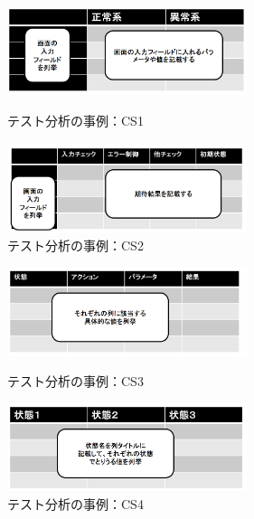 \documentclass[10pt,a4j]{jarticle}
\begin{document}
\begin{figure}[htbp]
 \begin{minipage}{0.5\hsize}
  \begin{center}
   \includegraphics[width=70mm]{./image/D-3-Fig1-1.png}
  \end{center}
  \caption{テスト分析の事例：CS1}
  \label{fig:one}
 \end{minipage}
 \begin{minipage}{0.5\hsize}
  \begin{center}
   \includegraphics[width=70mm]{./image/D-3-Fig1-2.png}
  \end{center}
  \caption{テスト分析の事例：CS2}
  \label{fig:two}
 \end{minipage}
\end{figure}

\begin{figure}[htbp]
 \begin{minipage}{0.5\hsize}
  \begin{center}
   \includegraphics[width=70mm]{./image/D-3-Fig1-3.png}
  \end{center}
  \caption{テスト分析の事例：CS3}
  \label{fig:one}
 \end{minipage}
 \begin{minipage}{0.5\hsize}
  \begin{center}
   \includegraphics[width=70mm]{./image/D-3-Fig1-4.png}
  \end{center}
  \caption{テスト分析の事例：CS4}
  \label{fig:two}
 \end{minipage}
\end{figure}
\end{document}
